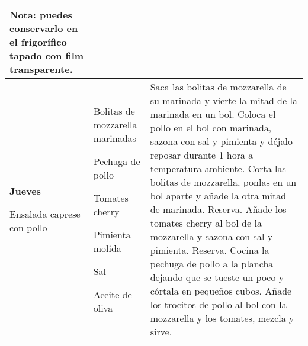 \documentclass[menu.tex]{subfiles}
\begin{document}
\begin{tabular} {p{3.5cm} p{4cm} p{9cm}}
Nota: puedes conservarlo en el frigorífico tapado con film transparente.\\
\hline
\pbox{20cm}
{
    \rule{0pt}{3ex}\begin{large}\textbf{Jueves}\end{large}\\ 
    \rule{0pt}{2ex}Ensalada caprese\\ con pollo
} & 
\vspace{-0.6cm}
            
\begin{compactitem} 
    \begin{scriptsize}
        \item Bolitas de mozzarella marinadas
        \item Pechuga de pollo
        \item Tomates cherry
        \item Pimienta molida
        \item Sal
        \item Aceite de oliva
    \end{scriptsize}
\end{compactitem} &
\vspace{-0.6cm}     
Saca las bolitas de mozzarella de su marinada y vierte la mitad de la marinada en un bol.
Coloca el pollo en el bol con marinada, sazona con sal y pimienta y déjalo reposar durante 1 hora a temperatura ambiente.
Corta las bolitas de mozzarella, ponlas en un bol aparte y añade la otra mitad de marinada. Reserva.
Añade los tomates cherry al bol de la mozzarella y sazona con sal y pimienta. Reserva.
Cocina la pechuga de pollo a la plancha dejando que se tueste un poco y córtala en pequeños cubos.
Añade los trocitos de pollo al bol con la mozzarella y los tomates, mezcla y sirve.\\
\hline


\end{tabular}
\end{document}
